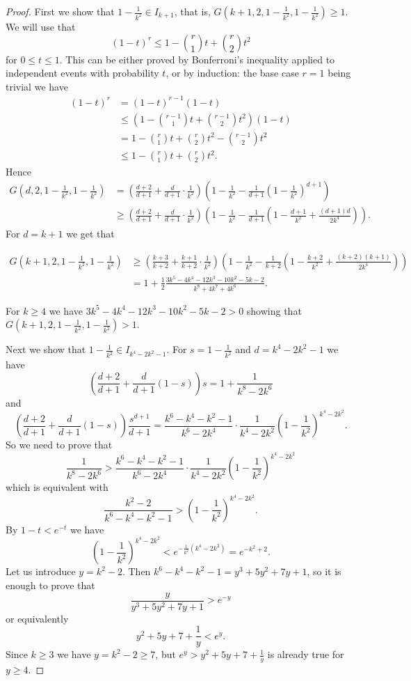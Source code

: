 \documentclass[12pt,a4paper]{amsart}
\numberwithin{equation}{section}
\theoremstyle{plain}
\theoremstyle{definition}
\newcommand{\1}{\textbf{1}}
\begin{document}
\begin{proof}
First we show that $1-\frac{1}{k^2}\in I_{k+1}$, that is, $G(k+1,2,1-\frac{1}{k^2},1-\frac{1}{k^2})\geqslant1$. We will use that
$$(1-t)^r\leqslant   1-\binom{r}{1}t+\binom{r}{2}t^2$$
for $0\leqslant   t\leqslant   1$. This can be either proved  by Bonferroni's inequality applied to independent events with probability $t$, or by induction: the base case $r=1$ being trivial we have
\begin{align*}
(1-t)^r&=(1-t)^{r-1}(1-t)\\
&\leqslant \left(1-\binom{r-1}{1}t+\binom{r-1}{2}t^2\right)(1-t)\\
&=1-\binom{r}{1}t+\binom{r}{2}t^2-\binom{r-1}{2}t^2\\
&\leqslant 1-\binom{r}{1}t+\binom{r}{2}t^2.
\end{align*}
\noindent Hence
\begin{align*}
G\left(d,2,1-\frac{1}{k^2},1-\frac{1}{k^2}\right)&=
\left(\frac{d+2}{d+1}+\frac{d}{d+1}\cdot \frac{1}{k^2}\right)\left(1-\frac{1}{k^2}-\frac{1}{d+1}\left(1-\frac{1}{k^2}\right)^{d+1}\right)\\
&\geqslant\left(\frac{d+2}{d+1}+\frac{d}{d+1}\cdot \frac{1}{k^2}\right)\left(1-\frac{1}{k^2}-\frac{1}{d+1}\left(1-\frac{d+1}{k^2}+\frac{(d+1)d}{2k^4}\right)\right).
\end{align*}
For $d=k+1$ we get that
\begin{small}
\begin{align*}
G\left(k+1,2,1-\frac{1}{k^2},1-\frac{1}{k^2}\right)&\geqslant\left(\frac{k+3}{k+2}+\frac{k+1}{k+2}\cdot \frac{1}{k^2}\right)\left(1-\frac{1}{k^2}-\frac{1}{k+2}\left(1-\frac{k+2}{k^2}+\frac{(k+2)(k+1)}{2k^4}\right)\right)\\
&=1+\frac{1}{2}\frac{3k^5 - 4k^4 - 12k^3 - 10k^2 - 5k - 2}{k^8 + 4k^7 + 4k^6}.
\end{align*}
\end{small}
For $k\geqslant4$ we have $3k^5 - 4k^4 - 12k^3 - 10k^2 - 5k - 2>0$ showing that $G\left(k+1,2,1-\frac{1}{k^2},1-\frac{1}{k^2}\right)>1$.

Next we show that $1-\frac{1}{k^2}\in I_{k^4-2k^2-1}$. For $s=1-\frac{1}{k^2}$ and $d=k^4-2k^2-1$ we have 
$$\left(\frac{d+2}{d+1}+\frac{d}{d+1}(1-s)\right)s=1+\frac{1}{k^8-2k^6}$$
and
$$\left(\frac{d+2}{d+1}+\frac{d}{d+1}(1-s)\right)\frac{s^{d+1}}{d+1}=\frac{k^6-k^4-k^2-1}{k^6-2k^4}\cdot \frac{1}{k^4-2k^2}\left(1-\frac{1}{k^2}\right)^{k^4-2k^2}.$$
So we need to prove that
$$\frac{1}{k^8-2k^6}>\frac{k^6-k^4-k^2-1}{k^6-2k^4}\cdot \frac{1}{k^4-2k^2}\left(1-\frac{1}{k^2}\right)^{k^4-2k^2}$$
which is equivalent with
$$\frac{k^2-2}{k^6-k^4-k^2-1}>\left(1-\frac{1}{k^2}\right)^{k^4-2k^2}.$$
By $1-t<e^{-t}$ we have
$$\left(1-\frac{1}{k^2}\right)^{k^4-2k^2}<e^{-\frac{1}{k^2}(k^4-2k^2)}=e^{-k^2+2}.$$
Let us introduce $y=k^2-2$. Then $k^6-k^4-k^2-1=y^3+5y^2+7y+1$, so it is enough to prove that
$$\frac{y}{y^3+5y^2+7y+1}>e^{-y}$$
or equivalently
$$y^2+5y+7+\frac{1}{y}<e^y.$$
Since $k\geqslant3$ we have $y=k^2-2\geqslant7$, but $e^y>y^2+5y+7+\frac{1}{y}$ is already true for $y\geqslant 4$.

\end{proof}
\end{document}
